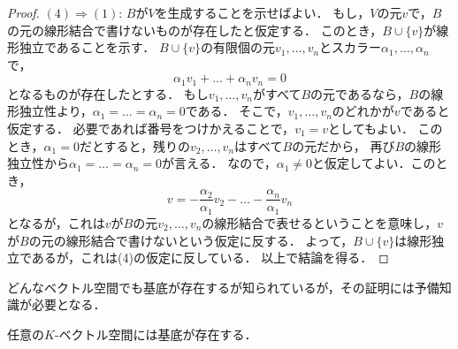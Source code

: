 \begin{proof}
    $(4)\Rightarrow (1)$:
    $B$が$V$を生成することを示せばよい．
    もし，$V$の元$v$で，$B$の元の線形結合で書けないものが存在したと仮定する．
    このとき，$B \cup \{v\}$が線形独立であることを示す．
    $B \cup \{v\}$の有限個の元$v_1,\dots,v_n$とスカラー$\alpha_1,\dots,\alpha_n$で，
    \[
        \alpha_1 v_1 + \dots + \alpha_n v_n = 0
    \]
    となるものが存在したとする．
    もし$v_1,\dots,v_n$がすべて$B$の元であるなら，$B$の線形独立性より，$\alpha_1 = \dots = \alpha_n = 0$である．
    そこで，$v_1,\dots,v_n$のどれかが$v$であると仮定する．
    必要であれば番号をつけかえることで，$v_1 = v$としてもよい．
    このとき，$\alpha_1 = 0$だとすると，残りの$v_2,\dots,v_n$はすべて$B$の元だから，
    再び$B$の線形独立性から$\alpha_1 = \dots = \alpha_n = 0$が言える．
    なので，$\alpha_1 \neq 0$と仮定してよい．このとき，
    \[
        v = -\frac{\alpha_2}{\alpha_1} v_2 - \dots - \frac{\alpha_n}{\alpha_1} v_n
    \]
    となるが，これは$v$が$B$の元$v_2,\dots,v_n$の線形結合で表せるということを意味し，$v$が$B$の元の線形結合で書けないという仮定に反する．
    よって，$B \cup \{v\}$は線形独立であるが，これは(4)の仮定に反している．
    以上で結論を得る．
\end{proof}
どんなベクトル空間でも基底が存在するが知られているが，その証明には予備知識が必要となる．
\begin{thm}
    任意の$K$-ベクトル空間には基底が存在する．
\end{thm}